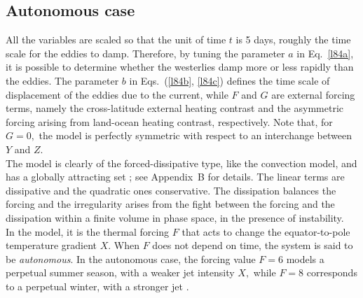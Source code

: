 \documentclass[%
 aip, cha,
 amsmath,amssymb,
 reprint,%
author-year,%
]{revtex4-1}
\newcommand{\0}{\mathbf 0}
\begin{document}
\subsection{Autonomous case} \label{ssec:auto}

All the variables are scaled so that the unit of time $t$ is 5 days, roughly the time scale for the eddies to damp. Therefore, by tuning the parameter $a$ in Eq.~\eqref{l84a}, it is possible to determine whether the westerlies damp more or less rapidly than the eddies. The parameter $b$ in Eqs.~(\ref{l84b}, \ref{l84c}) defines the time scale of displacement of the eddies due to the current, while $F$ and $G$ are external forcing terms, namely the cross-latitude external heating contrast and the asymmetric forcing arising from land-ocean heating contrast, respectively. Note that, for $G = 0,$ the model is perfectly symmetric with respect to an interchange between $Y$ and $Z.$\\ 
The model is clearly of the forced-dissipative type, like the \cite{Lorenz.1963} convection model, and has a globally attracting set \citep{Ghil.Chil.1987}; see Appendix~B for details. The linear terms are dissipative and the quadratic ones conservative. The dissipation balances the forcing and the irregularity arises from the fight between the forcing and the dissipation within a finite volume in phase space, in the presence of instability.\\
In the model, it is the thermal forcing $F$ that acts to change the equator-to-pole temperature gradient $X$. When $F$ does not depend on time, the system is said to be {\em autonomous}. In the autonomous case, the forcing value $F=6$ models a perpetual summer season, with a weaker jet intensity $X,$ while $F=8$ corresponds to a perpetual winter, with a stronger jet \citep{lorenz84}. 
\end{document}
